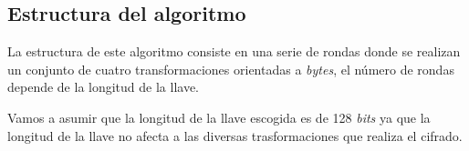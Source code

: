 \documentclass[peerreview]{IEEEtran}
\begin{document}
\subsection{Estructura del algoritmo}
La estructura de este algoritmo consiste en una serie de rondas donde se
realizan un conjunto de cuatro transformaciones orientadas a \textit{bytes}, el
número de rondas depende de la longitud de la llave.

Vamos a asumir que la longitud de la llave escogida es de 128 \textit{bits} ya
que la longitud de la llave no afecta a las diversas trasformaciones que
realiza el cifrado.
\begin{table}[h]
  \centering
  \caption{Número de rondas en función de la longitud de la llave}
  \label{tab:cuadro3}
\end{table}
\end{document}
